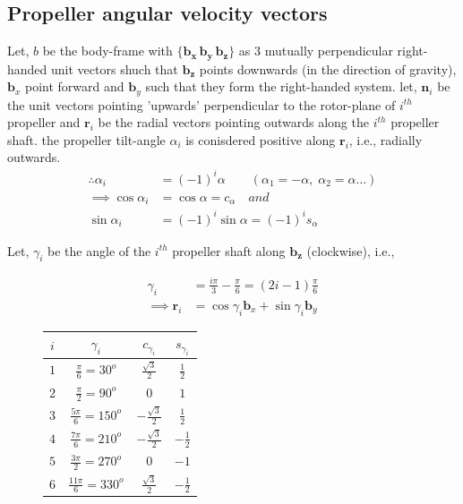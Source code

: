 \medskip

\subsection{Propeller angular velocity vectors}
Let, $b$ be the body-frame with $\{\pmb{b_x \, b_y \, b_z}\}$ as 3 mutually perpendicular right-handed unit vectors shuch that $\pmb{b_z}$ points downwards (in the direction of gravity), $\pmb{b}_x$ point forward and $\pmb{b}_y$ such that they form the right-handed system. let, $\pmb{n}_i$ be the unit vectors pointing 'upwards' perpendicular to the rotor-plane of $i^{th}$ propeller and $\pmb{r}_i$ be the radial vectors pointing outwards along the $i^{th}$ propeller shaft. the propeller tilt-angle $\alpha_i$ is conisdered positive along $\pmb{r}_i$, i.e., radially outwards.
\begin{align*}
   \therefore \alpha_i &= (-1)^{i} \alpha \qquad (\alpha_1 = -\alpha, \; \alpha_2 = \alpha \hdots) \\
   \implies \cos \alpha_i &= \cos \alpha  = c_{\alpha} \quad and\\
   \sin \alpha_i &= (-1)^{i} \sin \alpha = (-1)^{i} s_{\alpha}
\end{align*}

Let, $\gamma_i$ be the angle of the $i^{th}$ propeller shaft along $\pmb{b_z}$ (clockwise), i.e.,
\begin{figure}[H]
    \begin{minipage}{0.49 \textwidth}
            \begin{align*}
            \gamma_i &= \frac{i\pi}{3} - \frac{\pi}{6} = (2i-1)\frac{\pi}{6}\\
            \implies \pmb r_i &= \cos \gamma_i \pmb b_x + \sin \gamma_i \pmb b_y
            \end{align*}
    \end{minipage}
    \begin{minipage}{0.49 \textwidth}
        \begin{table}[H]
            \centering
            \begin{tabular}{c c c c }
                \hline \hline
                $i$ & $\gamma_i$ & $c_{\gamma_i}$ & $s_{\gamma_i}$ \\ \hline \hline
                $1$ & $\frac{\pi}{6} = 30^o$   & $\frac{\sqrt{3}}{2}$ & $\frac{1}{2}$ \\
                $2$ & $\frac{\pi}{2} = 90^o$   & $0$ & $1$ \\
                $3$ & $\frac{5\pi}{6} = 150^o$ & $-\frac{\sqrt{3}}{2}$ & $\frac{1}{2}$ \\
                $4$ & $\frac{7\pi}{6} = 210^o$ & $-\frac{\sqrt{3}}{2}$ & $-\frac{1}{2}$ \\
                $5$ & $\frac{3\pi}{2} = 270^o$ & 0 & $-1$ \\
                $6$ & $\frac{11\pi}{6} = 330^o$& $\frac{\sqrt{3}}{2}$ & $-\frac{1}{2}$ \\
                \hline \hline
            \end{tabular}
        \end{table}
    \end{minipage}
\end{figure}

